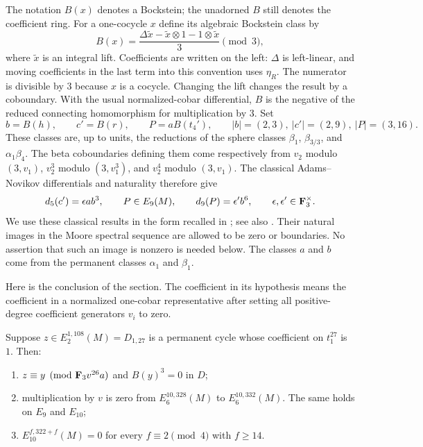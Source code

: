 The notation $B(x)$ denotes a Bockstein; the unadorned $B$ still
denotes the coefficient ring.  For a one-cocycle $x$ define its
algebraic Bockstein class by
\begin{equation}\label{finite:bockstein}
 B(x)=\frac{\Delta\widetilde x-\widetilde x\otimes1
                  -1\otimes\widetilde x}{3}\pmod3,
\end{equation}
where $\widetilde x$ is an integral lift.  Coefficients are written on
the left: $\Delta$ is left-linear, and moving coefficients in the last
term into this convention uses $\eta_R$.  The numerator is divisible
by $3$ because $x$ is a cocycle.  Changing the lift changes the result
by a coboundary.  With the usual normalized-cobar differential,
$B$ is the negative of the reduced connecting homomorphism for
multiplication by $3$.  Set
\[
 b=B(h),\qquad c'=B(r),\qquad P=aB(t_4'),
 \qquad |b|=(2,3),\ |c'|=(2,9),\ |P|=(3,16).
\]
These classes are, up to units, the reductions of the sphere classes
$\beta_1$, $\beta_{3/3}$, and $\alpha_1\beta_4$.  The beta
coboundaries defining them come respectively from $v_2$ modulo
$(3,v_1)$, $v_2^3$ modulo $(3,v_1^3)$, and $v_2^4$ modulo $(3,v_1)$.
The classical Adams--Novikov differentials and naturality therefore
give
\begin{equation}\label{finite:classical-differentials}
 d_5(c')=\epsilon ab^3,\qquad P\in E_9(M),\qquad
 d_9(P)=\epsilon' b^6,
 \qquad \epsilon,\epsilon'\in\mathbf F_3^\times.
\end{equation}
We use these classical results in the form recalled in
\cite[Lemma 2.5]{BelmontShimomura}; see also \cite{Ravenel}.
Their natural images in the Moore spectral sequence are allowed to
be zero or boundaries.  No assertion that such an image is nonzero
is needed below.  The classes $a$ and $b$ come from the permanent
classes $\alpha_1$ and $\beta_1$.

Here is the conclusion of the section.  The coefficient in its
hypothesis means the coefficient in a normalized one-cobar
representative after setting all positive-degree coefficient
generators $v_i$ to zero.

\begin{lemma}\label{finite:main}
Suppose $z\in E_2^{1,108}(M)=D_{1,27}$ is a permanent cycle whose
coefficient on $t_1^{27}$ is $1$.  Then:
\begin{enumerate}[label=\textup{(\roman*)}]
 \item $z\equiv y\pmod{\mathbf F_3v^{26}a}$ and $B(y)^3=0$ in $D$;
 \item multiplication by $v$ is zero from
 $E_6^{10,328}(M)$ to $E_6^{10,332}(M)$.  The same holds on
 $E_9$ and $E_{10}$;
 \item $E_{10}^{f,322+f}(M)=0$ for every
 $f\equiv2\pmod4$ with $f\geq14$.
\end{enumerate}
\end{lemma}


